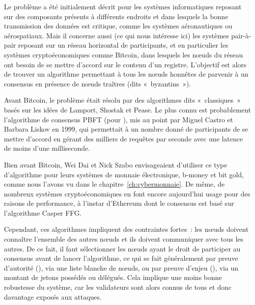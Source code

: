 Le problème a été initialement décrit pour les systèmes informatiques reposant sur des composants présents à différents endroits et dans lesquels la bonne transmission des données est critique, comme les systèmes aéronautiques ou aérospatiaux. Mais il concerne aussi (ce qui nous intéresse ici) les systèmes pair-à-pair reposant sur un réseau horizontal de participants, et en particulier les systèmes cryptoéconomiques comme Bitcoin, dans lesquels les nœuds du réseau ont besoin de se mettre d'accord sur le contenu d'un registre. L'objectif est alors de trouver un algorithme permettant à tous les nœuds honnêtes de parvenir à un consensus en présence de nœuds traîtres (dits «~byzantins~»).



Avant Bitcoin, le problème était résolu par des algorithmes dits «~classiques~» basés sur les idées de Lamport, Shostak et Pease. Le plus connu est probablement l'algorithme de consensus PBFT (pour ), mis au point par Miguel Castro et Barbara Liskov en 1999, qui permettait à un nombre donné de participants de se mettre d'accord en gérant des milliers de requêtes par seconde avec une latence de moins d'une milliseconde.

Bien avant Bitcoin, Wei Dai et Nick Szabo envisageaient d'utiliser ce type d'algorithme pour leurs systèmes de monnaie électronique, b-money et bit gold, comme nous l'avons vu dans le chapitre~\ref{ch:cybermonnaie}. De même, de nombreux systèmes cryptoéconomiques en font encore aujourd'hui usage pour des raisons de performance, à l'instar d'Ethereum dont le consensus est basé sur l'algorithme Casper FFG.

Cependant, ces algorithmes impliquent des contraintes fortes~: les nœuds doivent connaître l'ensemble des autres nœuds et ils doivent communiquer avec tous les autres. De ce fait, il faut sélectionner les nœuds ayant le droit de participer au consensus avant de lancer l'algorithme, ce qui se fait généralement par preuve d'autorité (), via une liste blanche de nœuds, ou par preuve d'enjeu (), via un montant de jetons possédés ou délégués. Cela implique une moins bonne robustesse du système, car les validateurs sont alors connus de tous et donc davantage exposés aux attaques.

